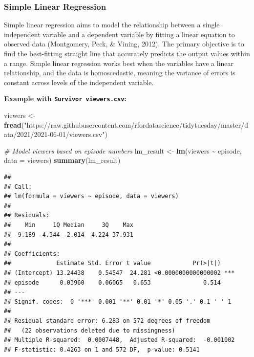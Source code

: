 \documentclass[
  b5paper]{book}
\newenvironment{Shaded}{\begin{snugshade}}{\end{snugshade}}
\newcommand{\AttributeTok}[1]{\textcolor[rgb]{0.13,0.29,0.53}{#1}}
\newcommand{\CommentTok}[1]{\textcolor[rgb]{0.56,0.35,0.01}{\textit{#1}}}
\newcommand{\FunctionTok}[1]{\textcolor[rgb]{0.13,0.29,0.53}{\textbf{#1}}}
\newcommand{\NormalTok}[1]{#1}
\newcommand{\OtherTok}[1]{\textcolor[rgb]{0.56,0.35,0.01}{#1}}
\newcommand{\SpecialCharTok}[1]{\textcolor[rgb]{0.81,0.36,0.00}{\textbf{#1}}}
\newcommand{\StringTok}[1]{\textcolor[rgb]{0.31,0.60,0.02}{#1}}
\begin{document}
\hypertarget{simple-linear-regression}{%
\subsubsection*{Simple Linear Regression}\label{simple-linear-regression}}

Simple linear regression aims to model the relationship between a single independent variable and a dependent variable by fitting a linear equation to observed data (Montgomery, Peck, \& Vining, 2012). The primary objective is to find the best-fitting straight line that accurately predicts the output values within a range. Simple linear regression works best when the variables have a linear relationship, and the data is homoscedastic, meaning the variance of errors is constant across levels of the independent variable.

\textbf{Example with \texttt{Survivor\ viewers.csv}:}

\begin{Shaded}
\begin{Highlighting}[]
\NormalTok{viewers }\OtherTok{\textless{}{-}} \FunctionTok{fread}\NormalTok{(}\StringTok{"https://raw.githubusercontent.com/rfordatascience/tidytuesday/master/data/2021/2021{-}06{-}01/viewers.csv"}\NormalTok{)}

\CommentTok{\# Model viewers based on episode numbers}
\NormalTok{lm\_result }\OtherTok{\textless{}{-}} \FunctionTok{lm}\NormalTok{(viewers }\SpecialCharTok{\textasciitilde{}}\NormalTok{ episode, }\AttributeTok{data =}\NormalTok{ viewers)}
\FunctionTok{summary}\NormalTok{(lm\_result)}
\end{Highlighting}
\end{Shaded}

\begin{verbatim}
## 
## Call:
## lm(formula = viewers ~ episode, data = viewers)
## 
## Residuals:
##    Min     1Q Median     3Q    Max 
## -9.189 -4.344 -2.014  4.224 37.931 
## 
## Coefficients:
##             Estimate Std. Error t value            Pr(>|t|)    
## (Intercept) 13.24438    0.54547  24.281 <0.0000000000000002 ***
## episode      0.03960    0.06065   0.653               0.514    
## ---
## Signif. codes:  0 '***' 0.001 '**' 0.01 '*' 0.05 '.' 0.1 ' ' 1
## 
## Residual standard error: 6.283 on 572 degrees of freedom
##   (22 observations deleted due to missingness)
## Multiple R-squared:  0.0007448,  Adjusted R-squared:  -0.001002 
## F-statistic: 0.4263 on 1 and 572 DF,  p-value: 0.5141
\end{verbatim}
\end{document}
